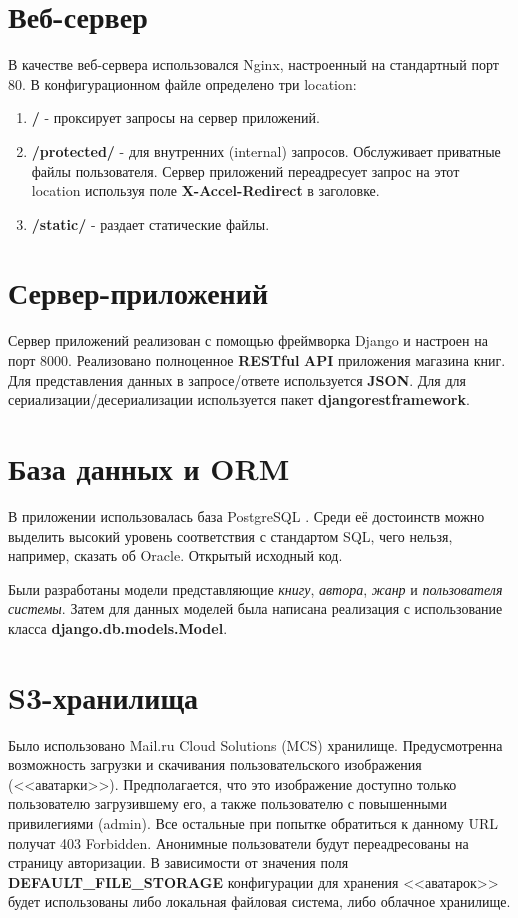 \section{Веб-сервер}
В качестве веб-сервера использовался Nginx, настроенный на стандартный порт 80. В конфигурационном файле определено три location:
\begin{enumerate}
  \item \textbf{/} - проксирует запросы на сервер приложений.
  \item \textbf{/protected/} - для внутренних (internal) запросов. Обслуживает приватные файлы пользователя. Сервер приложений переадресует запрос на этот location используя поле \textbf{X-Accel-Redirect} в заголовке.
  \item \textbf{/static/} - раздает статические файлы.
\end{enumerate}
\section{Сервер-приложений}
Сервер приложений реализован с помощью фреймворка Django и настроен на порт 8000. Реализовано полноценное \textbf{RESTful} \textbf{API} приложения магазина книг. Для представления данных в запросе/ответе используется \textbf{JSON}. Для для сериализации/десериализации используется пакет \textbf{djangorestframework}.
\section{База данных и ORM}
В приложении использовалась база PostgreSQL \cite{postgresql_documentation}. Среди её достоинств можно выделить высокий уровень соответствия с стандартом SQL, чего нельзя, например, сказать об Oracle. Открытый исходный код.

Были разработаны модели представляющие \textit{книгу}, \textit{автора}, \textit{жанр} и \textit{пользователя системы}. Затем для данных моделей была написана реализация с использование класса \textbf{django.db.models.Model}.
\section{S3-хранилища}
Было использовано Mail.ru Cloud Solutions (MCS) хранилище. Предусмотренна возможность загрузки и скачивания пользовательского изображения (<<аватарки>>). Предполагается, что это изображение доступно только пользователю загрузившему его, а также пользователю с повышенными привилегиями (admin). Все остальные при попытке обратиться к данному URL получат 403 Forbidden. Анонимные пользователи будут переадресованы на страницу авторизации. В зависимости от значения поля \textbf{DEFAULT\_FILE\_STORAGE} конфигурации для хранения <<аватарок>> будет использованы либо локальная файловая система, либо облачное хранилище.
